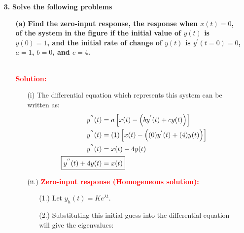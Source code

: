\documentclass[a4paper, 12pt]{article}
\begin{document}
\pagebreak
\begin{itemize}
\item[\textbf{3.}]{\textbf{Solve the following problems}}
\begin{itemize}
\item[\textbf{(a)}]{\textbf{Find the zero-input response, the response when $x(t) = 0$, of the system in the figure if the initial value of $y(t)$ is $y(0) = 1$, and the initial rate of change of $y(t)$ is $y^{'}(t = 0) = 0$, $a = 1$, $b = 0$, and $c=4$.}}
\begin{figure}[h!]
\end{figure} \\
\textcolor{red}{\textbf{Solution:}}
\begin{itemize}
\item[(i)]{The differential equation which represents this system can be written as:}
\begin{equation}
\begin{gathered}
\begin{alignedat}{1}
y^{''}(t) &= a \left[ x(t) - \left(b y^{'}(t) + c y(t) \right) \right] \\
y^{''}(t) &= (1) \left[ x(t) - \left((0) y^{'}(t) + (4) y(t) \right) \right] \\
y^{''}(t) &=  x(t) -  4 y(t) \\
\Aboxed{y^{''}(t) + 4 y(t) &= x(t)}
\end{alignedat}
\end{gathered}
\end{equation}
\item[(ii.)]{\textcolor{red}{\textbf{Zero-input response (Homogeneous solution):}}}
\begin{itemize}
\item[(1.)]{Let $y_{h}(t) = Ke^{\lambda t}$}.
\item[(2.)]{Substituting this initial guess into the differential equation will give the eigenvalues:}

\end{itemize}
\end{itemize}
\end{itemize}
\end{itemize}
\end{document}
